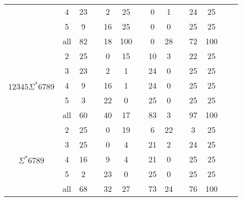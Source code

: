 \begin{table*}[]
\begin{tabular}{cc|ccc|ccc|ccc|ccc}
        & 4 & 23 &  & 2 & 25 &  & 0 & 1 &  & 24 & 25 &  &  \\
        & 5 & 9 &  & 16 & 25 &  & 0 & 0 &  & 25 & 25 &  &  \\
        & all & 82 &  & 18 & 100 &  & 0 & 28 &  & 72 & 100 &  &  \\ \hline
       \multirow{5}{*}{$12345\Sigma^*6789$} & 2 & 25 &  & 0 & 15 &  & 10 & 3 &  & 22 & 25 &  & \multicolumn{1}{l}{} \\
        & 3 & 23 &  & 2 & 1 &  & 24 & 0 &  & 25 & 25 &  & \multicolumn{1}{l}{} \\
        & 4 & 9 &  & 16 & 1 &  & 24 & 0 &  & 25 & 25 &  & \multicolumn{1}{l}{} \\
        & 5 & 3 &  & 22 & 0 &  & 25 & 0 &  & 25 & 25 &  &  \\
        & all & 60 &  & 40 & 17 &  & 83 & 3 &  & 97 & 100 &  &  \\ \hline
       \multirow{5}{*}{$\Sigma^*6789$} & 2 & 25 &  & 0 & 19 &  & 6 & 22 &  & 3 & 25 &  & \multicolumn{1}{l}{} \\
        & 3 & 25 &  & 0 & 4 &  & 21 & 2 &  & 24 & 25 &  & \multicolumn{1}{l}{} \\
        & 4 & 16 &  & 9 & 4 &  & 21 & 0 &  & 25 & 25 &  & \multicolumn{1}{l}{} \\
        & 5 & 2 &  & 23 & 0 &  & 25 & 0 &  & 25 & 25 &  & \multicolumn{1}{l}{} \\
        & all & 68 &  & 32 & 27 &  & 73 & 24 &  & 76 & 100 &  & 
       \end{tabular}
\end{table*}